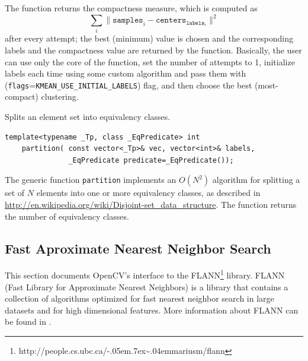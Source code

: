 The function returns the compactness measure, which is computed as
\[
\sum_i \|\texttt{samples}_i - \texttt{centers}_{\texttt{labels}_i}\|^2
\]
after every attempt; the best (minimum) value is chosen and the
corresponding labels and the compactness value are returned by the function.
Basically, the user can use only the core of the function, set the number of
attempts to 1, initialize labels each time using some custom algorithm and pass them with
\newline (\texttt{flags}=\texttt{KMEAN\_USE\_INITIAL\_LABELS}) flag, and then choose the best (most-compact) clustering.

\label{partition}
Splits an element set into equivalency classes.

\begin{lstlisting}
template<typename _Tp, class _EqPredicate> int
    partition( const vector<_Tp>& vec, vector<int>& labels,
               _EqPredicate predicate=_EqPredicate());
\end{lstlisting}
\begin{description}
\end{description}

The generic function \texttt{partition} implements an $O(N^2)$ algorithm for
splitting a set of $N$ elements into one or more equivalency classes, as described in \url{http://en.wikipedia.org/wiki/Disjoint-set_data_structure}. The function
returns the number of equivalency classes.


\subsection{Fast Aproximate Nearest Neighbor Search}

\def\urltilda{\kern -.05em\lower .7ex\hbox{\~{}}\kern .04em}

This section documents OpenCV's interface to the FLANN\footnote{http://people.cs.ubc.ca/\urltilda mariusm/flann} library. FLANN (Fast Library for Approximate Nearest Neighbors) is a library that
contains a collection of algorithms optimized for fast nearest neighbor search in large datasets and for high dimensional features. More 
information about FLANN can be found in \cite{muja_flann_2009}.

